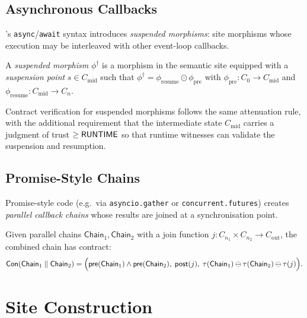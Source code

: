 \documentclass[11pt]{article}
\newcommand{\Chain}{\mathsf{Chain}}            %
\newcommand{\Contract}{\mathsf{Con}}           %
\newcommand{\Pre}{\mathsf{pre}}                %
\newcommand{\Post}{\mathsf{post}}              %
\newcommand{\compose}{\mathbin{\odot}}         %
\begin{document}
\subsection{Asynchronous Callbacks}

\Python's \texttt{async}/\texttt{await} syntax introduces
\emph{suspended morphisms}: site morphisms whose execution may be
interleaved with other event-loop callbacks.

\begin{definition}\label{def:suspended}
A \emph{suspended morphism} $\phi^\dagger$ is a morphism in the
semantic site equipped with a \emph{suspension point}
$s \in C_{\mathrm{mid}}$ such that
$\phi^\dagger = \phi_{\mathrm{resume}} \compose \phi_{\mathrm{pre}}$
with $\phi_{\mathrm{pre}} : C_0 \to C_{\mathrm{mid}}$ and
$\phi_{\mathrm{resume}} : C_{\mathrm{mid}} \to C_n$.
\end{definition}

Contract verification for suspended morphisms follows the same
attenuation rule, with the additional requirement that the
intermediate state $C_{\mathrm{mid}}$ carries a judgment of trust
$\ge \mathsf{RUNTIME}$ so that runtime witnesses can validate the suspension
and resumption.

\subsection{Promise-Style Chains}

Promise-style code (e.g.\ via \texttt{asyncio.gather} or
\texttt{concurrent.futures}) creates \emph{parallel callback chains}
whose results are joined at a synchronisation point.

\begin{construction}\label{const:parallel}
Given parallel chains $\Chain_1, \Chain_2$ with a join
function $j : C_{n_1} \times C_{n_2} \to C_{\mathrm{out}}$,
the combined chain has contract:
\[
  \Contract(\Chain_1 \parallel \Chain_2) =
    \Bigl(\Pre(\Chain_1) \wedge \Pre(\Chain_2),\;
          \Post(j),\;
          \tau(\Chain_1) \tatten \tau(\Chain_2) \tatten \tau(j)\Bigr).
\]
\end{construction}

\section{Site Construction}\label{sec:site}
\end{document}
